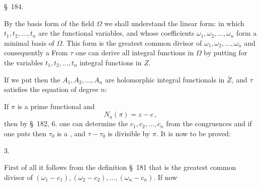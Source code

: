 \begin{center}
\S\ 184. 
\end{center}

By the basis form of the field $\Omega$ we shall understand the linear
 form:
in which $t_1, t_2, \ldots, t_n$ are the functional variables, and whose coefficients
 $\omega_1, \omega_2, \ldots, \omega_n$ form a minimal basis of $\Omega$. This
form is the greatest common divisor of $\omega_1, \omega_2, \ldots, \omega_n$
and consequently a  From $\tau$ one can derive all integral
functions in $\Omega$ by putting for the variables $t_1,
t_2, \ldots, t_n$ integral functions in $Z$.

If we put
then the $A_1, A_2, \ldots, A_n$ are holomorphic integral functionals in
$\overline{Z}$, and $\tau$ satisfies the equation of degree $n$:

If $\pi$ is a prime functional and
\[
N_a(\pi) = z - c\,,
\]
then by \S\ 182, 6. one can determine the  $c_1, c_2, \ldots, c_n$ from
the congruences
and if one puts
then $\tau_0$ is a , and $\tau - \tau_0$ is
divisible by $\pi$. It is now to be proved:

3. 

First of all it follows from the definition \S\ 181 that
is the greatest common divisor of $(\omega_1 - c_1), (\omega_2 - c_2), \ldots,
(\omega_n - c_n)$. If now
